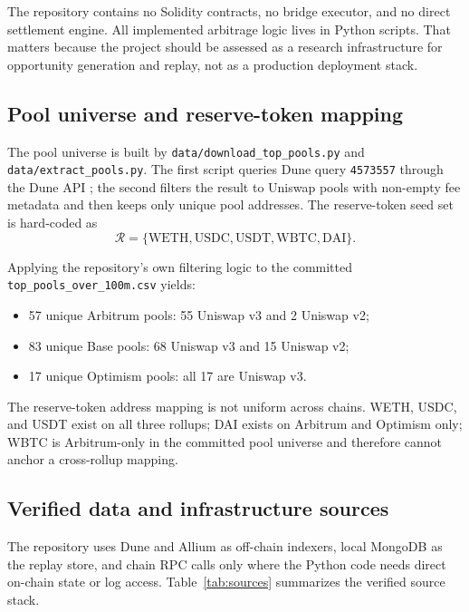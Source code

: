 \documentclass[11pt]{article}
\begin{document}
The repository contains no Solidity contracts, no bridge executor, and no direct settlement engine. All implemented arbitrage logic lives in Python scripts. That matters because the project should be assessed as a research infrastructure for opportunity generation and replay, not as a production deployment stack.

\subsection{Pool universe and reserve-token mapping}

The pool universe is built by \texttt{data/download\_top\_pools.py} and \texttt{data/extract\_pools.py}. The first script queries Dune query \texttt{4573557} through the Dune API \cite{duneapi}; the second filters the result to Uniswap pools with non-empty fee metadata and then keeps only unique pool addresses. The reserve-token seed set is hard-coded as
\[
\mathcal{R} = \{\text{WETH}, \text{USDC}, \text{USDT}, \text{WBTC}, \text{DAI}\}.
\]

Applying the repository's own filtering logic to the committed \texttt{top\_pools\_over\_100m.csv} yields:
\begin{itemize}[leftmargin=1.5em]
    \item 57 unique Arbitrum pools: 55 Uniswap v3 and 2 Uniswap v2;
    \item 83 unique Base pools: 68 Uniswap v3 and 15 Uniswap v2;
    \item 17 unique Optimism pools: all 17 are Uniswap v3.
\end{itemize}

The reserve-token address mapping is not uniform across chains. WETH, USDC, and USDT exist on all three rollups; DAI exists on Arbitrum and Optimism only; WBTC is Arbitrum-only in the committed pool universe and therefore cannot anchor a cross-rollup mapping.

\subsection{Verified data and infrastructure sources}

The repository uses Dune and Allium as off-chain indexers, local MongoDB as the replay store, and chain RPC calls only where the Python code needs direct on-chain state or log access. Table~\ref{tab:sources} summarizes the verified source stack.
\end{document}

